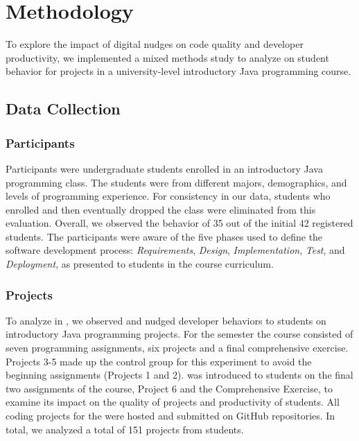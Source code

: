 \section{Methodology}

To explore the impact of digital nudges on code quality and developer productivity, we implemented a mixed methods study to analyze \framework on student behavior for projects in a university-level introductory Java programming course.

\subsection{Data Collection}

\subsubsection{Participants} 

Participants were undergraduate students enrolled in an introductory Java programming class. The students were from different majors, demographics, and levels of programming experience. For consistency in our data, students who enrolled and then eventually dropped the class were eliminated from this evaluation. Overall, we observed the behavior of 35 out of the initial 42 registered students. The participants were aware of the five phases used to define the software development process: \textit{Requirements}, \textit{Design}, \textit{Implementation}, \textit{Test}, and \textit{Deployment}, as presented to students in the course curriculum.

\subsubsection{Projects}

To analyze \framework in \tooltwo, we observed and nudged developer behaviors to students on introductory Java programming projects. For the semester the course consisted of seven programming assignments, six projects and a final comprehensive exercise. Projects 3-5 made up the control group for this experiment to avoid the beginning assignments (Projects 1 and 2). \tooltwo was introduced to students on the final two assignments of the course, Project 6 and the Comprehensive Exercise, to examine its impact on the quality of projects and productivity of students. All coding projects for the were hosted and submitted on GitHub repositories. In total, we analyzed a total of 151 projects from students.

